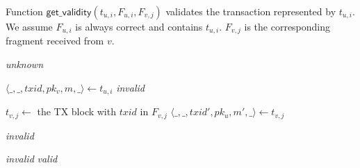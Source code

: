\begin{algorithm}
\caption{Function $\textsf{get\_validity}(t_{u, i}, F_{u, i}, F_{v, j})$ validates the transaction represented by $t_{u, i}$.
We assume $F_{u, i}$ is always correct and contains $t_{u, i}$.
$F_{v, j}$ is the corresponding fragment received from $v$.}
\label{alg:get-validity}

\begin{algorithmic}

        \State \Return \emph{unknown}
    \EndIf

    \label{line:valid-fragment}
    \State $\langle \_, \_, txid, pk_v, m, \_ \rangle \gets t_{u, i}$
        \State \Return \emph{invalid}
    \EndIf

    \State $t_{v, j} \gets $ the TX block with $txid$ in $F_{v, j}$
    \State $\langle \_, \_, txid', pk_u, m', \_ \rangle \gets t_{v, j}$ 

        \State \Return \emph{invalid}
    \EndIf

        \State \Return \emph{invalid}
    \EndIf
    \State \Return \emph{valid}
\end{algorithmic}
\end{algorithm}

